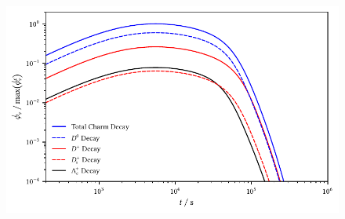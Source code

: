 \begin{figure}[H]
	\centering
	\includegraphics{../plots/build/magnetar_charm_decay_comparison_with.pdf}
	\caption[Magnetar $\nu \kern+0.5pt$ flux from $c$ decay including optical depth.]
			{}
	\label{fig:magnetar-charm-comparison-with}
\end{figure}
